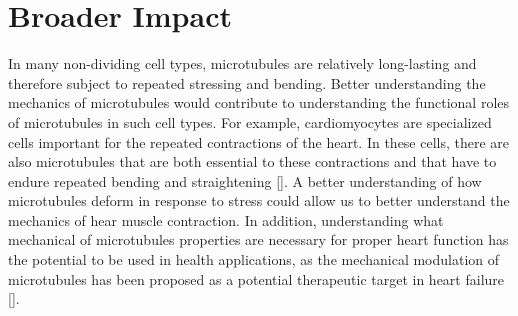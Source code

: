 \section{Broader Impact}
In many non-dividing cell types, microtubules are relatively long-lasting and therefore subject to repeated stressing and bending. Better understanding the mechanics of microtubules would contribute to understanding the functional roles of microtubules in such cell types. For example, cardiomyocytes are specialized cells important for the repeated contractions of the heart. In these cells, there are also microtubules that are both essential to these contractions and that have to endure repeated bending and straightening [\cite{cardmy_review}]. A better understanding of how microtubules deform in response to stress could allow us to better understand the mechanics of hear muscle contraction. In addition, understanding what mechanical of microtubules properties are necessary for proper heart function has the potential to be used in health applications, as the mechanical modulation of microtubules has been proposed as a potential therapeutic target in heart failure [\cite{card_HF}]. 



